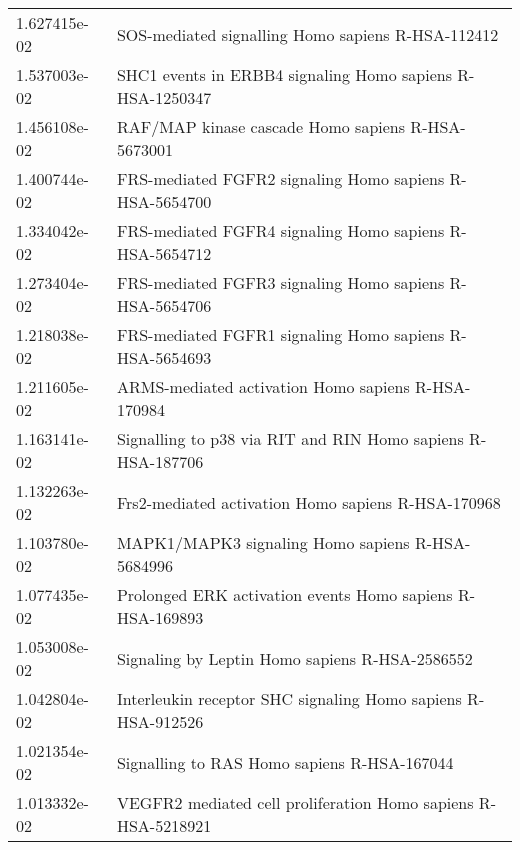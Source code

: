 \begin{longtable}{p{2.4cm}p{14.5cm}}
             1.627415e-02 &                                             SOS-mediated signalling Homo sapiens R-HSA-112412 \\
             1.537003e-02 &                                     SHC1 events in ERBB4 signaling Homo sapiens R-HSA-1250347 \\
             1.456108e-02 &                                             RAF/MAP kinase cascade Homo sapiens R-HSA-5673001 \\
             1.400744e-02 &                                       FRS-mediated FGFR2 signaling Homo sapiens R-HSA-5654700 \\
             1.334042e-02 &                                       FRS-mediated FGFR4 signaling Homo sapiens R-HSA-5654712 \\
             1.273404e-02 &                                       FRS-mediated FGFR3 signaling Homo sapiens R-HSA-5654706 \\
             1.218038e-02 &                                       FRS-mediated FGFR1 signaling Homo sapiens R-HSA-5654693 \\
             1.211605e-02 &                                            ARMS-mediated activation Homo sapiens R-HSA-170984 \\
             1.163141e-02 &                                   Signalling to p38 via RIT and RIN Homo sapiens R-HSA-187706 \\
             1.132263e-02 &                                            Frs2-mediated activation Homo sapiens R-HSA-170968 \\
             1.103780e-02 &                                              MAPK1/MAPK3 signaling Homo sapiens R-HSA-5684996 \\
             1.077435e-02 &                                     Prolonged ERK activation events Homo sapiens R-HSA-169893 \\
             1.053008e-02 &                                                Signaling by Leptin Homo sapiens R-HSA-2586552 \\
             1.042804e-02 &                                  Interleukin receptor SHC signaling Homo sapiens R-HSA-912526 \\
             1.021354e-02 &                                                   Signalling to RAS Homo sapiens R-HSA-167044 \\
             1.013332e-02 &                                 VEGFR2 mediated cell proliferation Homo sapiens R-HSA-5218921 \\

\end{longtable}
